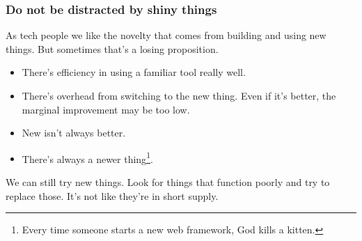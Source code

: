 \documentclass[10pt]{beamer}
\begin{document}
\begin{frame}
  \frametitle{Do not be distracted by shiny things}
  
   As tech people we like the novelty that comes from building and using 
   new things. But sometimes that's a losing proposition.
   
   \begin{itemize}
     \item There's efficiency in using a familiar tool really well.
     \item There's overhead from switching to the new thing. Even if
     it's better, the marginal improvement may be too low.
     \item New isn't always better.
     \item There's always a newer thing\footnote{Every time someone starts a new web framework, God kills a kitten.}.
   \end{itemize}  
   
   We can still try new things. Look for things that function poorly and try to replace those.
   It's not like they're in short supply.
   
\end{frame}
\end{document}
